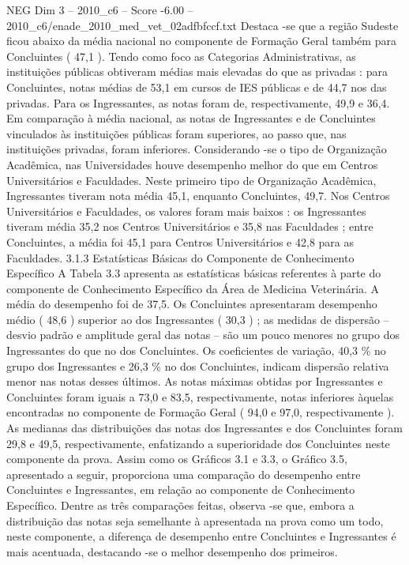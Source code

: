 \begin{textsample}{NEG Dim 3 – 2010\_c6 – Score -6.00 – 2010\_c6/enade\_2010\_med\_vet\_02adfbfccf.txt}
Destaca -se que a região Sudeste ficou abaixo da média nacional no componente de Formação Geral também para Concluintes ( 47,1 ).
Tendo como foco as Categorias Administrativas, as instituições públicas obtiveram médias mais elevadas do que as privadas : para Concluintes, notas médias de 53,1 em cursos de IES públicas e de 44,7 nos das privadas.
Para os Ingressantes, as notas foram de, respectivamente, 49,9 e 36,4.
Em comparação à média nacional, as notas de Ingressantes e de Concluintes vinculados às instituições públicas foram superiores, ao passo que, nas instituições privadas, foram inferiores.
Considerando -se o tipo de Organização Acadêmica, nas Universidades houve desempenho melhor do que em Centros Universitários e Faculdades.
Neste primeiro tipo de Organização Acadêmica, Ingressantes tiveram nota média 45,1, enquanto Concluintes, 49,7.
Nos Centros Universitários e Faculdades, os valores foram mais baixos : os Ingressantes tiveram média 35,2 nos Centros Universitários e 35,8 nas Faculdades ; entre Concluintes, a média foi 45,1 para Centros Universitários e 42,8 para as Faculdades. 3.1.3 Estatísticas Básicas do Componente de Conhecimento Específico A Tabela 3.3 apresenta as estatísticas básicas referentes à parte do componente de Conhecimento Específico da Área de Medicina Veterinária.
A média do desempenho foi de 37,5.
Os Concluintes apresentaram desempenho médio ( 48,6 ) superior ao dos Ingressantes ( 30,3 ) ; as medidas de dispersão – desvio padrão e amplitude geral das notas – são um pouco menores no grupo dos Ingressantes do que no dos Concluintes.
Os coeficientes de variação, 40,3 \% no grupo dos Ingressantes e 26,3 \% no dos Concluintes, indicam dispersão relativa menor nas notas desses últimos.
As notas máximas obtidas por Ingressantes e Concluintes foram iguais a 73,0 e 83,5, respectivamente, notas inferiores àquelas encontradas no componente de Formação Geral ( 94,0 e 97,0, respectivamente ).
As medianas das distribuições das notas dos Ingressantes e dos Concluintes foram 29,8 e 49,5, respectivamente, enfatizando a superioridade dos Concluintes neste componente da prova.
Assim como os Gráficos 3.1 e 3.3, o Gráfico 3.5, apresentado a seguir, proporciona uma comparação do desempenho entre Concluintes e Ingressantes, em relação ao componente de Conhecimento Específico.
Dentre as três comparações feitas, observa -se que, embora a distribuição das notas seja semelhante à apresentada na prova como um todo, neste componente, a diferença de desempenho entre Concluintes e Ingressantes é mais acentuada, destacando -se o melhor desempenho dos primeiros.

\end{textsample}
